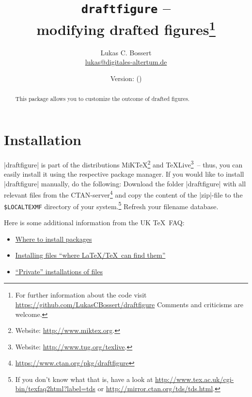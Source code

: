 \documentclass[a4paper,
12pt,
english
]{ltxdoc}
\newcommand\df{draftfigure\xspace}
\newcommand\dfstring{|draftfigure|\xspace}
\begin{document}
\title{\texttt{\df} -- \\ modifying drafted figures\footnote{%
For further information about the code visit \href{https://github.com/LukasCBossert/draftfigure}{https://github.com/LukasCBossert/draftfigure}
Comments and criticisms are welcome.}}
\author{Lukas C. Bossert\\{\small \href{mailto:lukas@digitales-altertum.de}{lukas@digitales-altertum.de}}}
\date{Version: \dfdate{} (\dfversion)} 
\maketitle

\begin{abstract}
\noindent This package allows you to customize the outcome of drafted figures.
\end{abstract}


\footnotesize\parskip=0mm \tableofcontents

\section{Installation}
\dfstring is part of the distributions MiK\TeX \footnote{Website: \url{http://www.miktex.org}.} 
and \TeX Live\footnote{Website: \url{http://www.tug.org/texlive}.}~-- thus, you
can easily install it using the respective package manager. 
If you would like to
install \dfstring manually, do the following:
Download the folder \dfstring with all relevant files from the CTAN-server\footnote{\url{https://www.ctan.org/pkg/\df}} and copy the content of the |zip|-file to the \texttt{\$LOCALTEXMF} directory of
 your system.\footnote{If you don't know what that is, have a look at
\url{http://www.tex.ac.uk/cgi-bin/texfaq2html?label=tds} or 
\url{http://mirror.ctan.org/tds/tds.html}.} 
Refresh your filename database.

Here is some additional information from the UK \TeX\ FAQ:
\begin{itemize}[nosep,after=\vspace{-\baselineskip} ]
  \item \href{%
    http://www.tex.ac.uk/cgi-bin/texfaq2html?label=install-where}{%
    Where to install packages}
  \item \href{%
    http://www.tex.ac.uk/cgi-bin/texfaq2html?label=inst-wlcf}{%
    Installing files \enquote{where \LaTeX /TeX\ can find them}}
  \item \href{%
    http://www.tex.ac.uk/cgi-bin/texfaq2html?label=privinst}{%
    \enquote{Private} installations of files}
\end{itemize}
\end{document}
